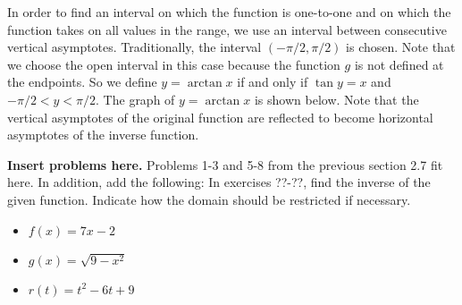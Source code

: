 In order to find an interval on which the function is one-to-one and on which the function takes on all values in the range, we use an interval between consecutive vertical asymptotes. Traditionally, the interval $(-\pi/2,\pi/2)$ is chosen. Note that we choose the open interval in this case because the function $g$ is not defined at the endpoints. So we define $y=\arctan x$ if and only if $\tan y=x$ and $-\pi/2< y<\pi/2$. The graph of $y=\arctan x$ is shown below. Note that the vertical asymptotes of the original function are reflected to become horizontal asymptotes of the inverse function.

\begin{center}
\end{center}

{\bfseries Insert problems here.} Problems 1-3 and 5-8 from the previous section 2.7 fit here. In addition, add the following:
In exercises ??-??, find the inverse of the given function. Indicate how the domain should be restricted if necessary.
\begin{itemize}
\item $f(x)=7x-2$
\item $g(x)=\sqrt{9-x^2}$
\item $r(t)=t^2-6t+9$
\end{itemize}